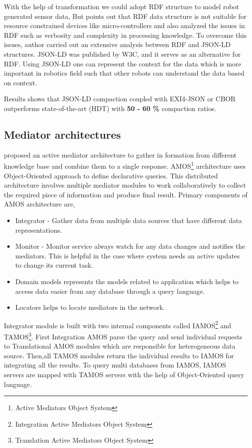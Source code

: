 \documentclass[12pt]{article}
\begin{document}
With the help of transformation we could adopt RDF structure to model robot generated sensor data, But \citet{charpenay2018towards} points out that RDF data structure is not suitable for resource constrained devices like micro-controllers and also analyzed the issues in RDF such as verbosity and complexity in processing knowledge. To overcome this issues, author carried out an extensive analysis between RDF and JSON-LD structures. JSON-LD was published by W3C, and it serves as an alternative for RDF. Using JSON-LD one can represent the context for the data which is more important in robotics field such that other robots can understand the data based on context.

Results shows that JSON-LD compaction coupled with EXI4-JSON or CBOR outperforms state-of-the-art (HDT) with \textbf{50 - 60 \% }compaction ratios.

\subsection{Mediator architectures}
\citet{fahl1993amos} proposed an active mediator architecture to gather in
formation from different knowledge base and combine them to a single response. AMOS\footnote{\label{amos}Active Mediators Object System} architecture uses Object-Oriented approach to define declarative queries. This distributed architecture involves multiple mediator modules to work collaboratively to collect the required piece of information and produce final result. Primary components of AMOS architecture are,
\begin{itemize}
	\item Integrator - Gather data from multiple data sources that have different data representations.
	\item Monitor - Monitor service always watch for any data changes and notifies the mediators. This is helpful in the case where system needs an active updates to change its current task.
	\item Domain models represents the models related to application which helps to access data easier from any database through a query language.
	\item Locators helps to locate mediators in the network.
\end{itemize}


Integrator module is built with two internal components called IAMOS\footnote{\label{amos}Integration Active Mediators Object System} and TAMOS\footnote{\label{amos}Translation Active Mediators Object System}. 
First Integration AMOS parse the query and send individual requests to Translational AMOS modules which are responsible for heterogeneous data source.
Then,all TAMOS modules return the individual results to IAMOS for integrating all the results. To query multi databases from IAMOS, IAMOS servers are mapped with TAMOS servers with the help of Object-Oriented query language.
\end{document}
